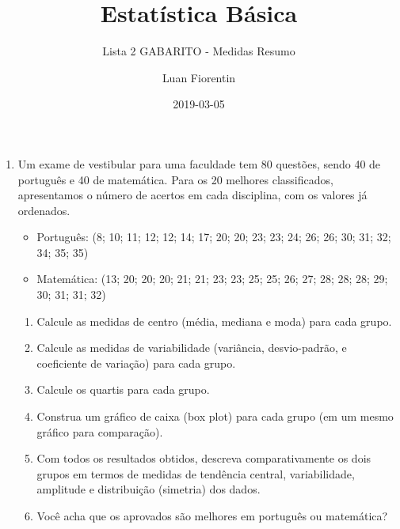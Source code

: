 \documentclass[]{article}
\title{Estatística Básica}
\subtitle{Lista 2 GABARITO - Medidas Resumo}
\author{Luan Fiorentin}
\date{2019-03-05}
\newenvironment{Shaded}{\begin{snugshade}}{\end{snugshade}}
\newcommand{\KeywordTok}[1]{\textcolor[rgb]{0.13,0.29,0.53}{\textbf{#1}}}
\newcommand{\CommentTok}[1]{\textcolor[rgb]{0.56,0.35,0.01}{\textit{#1}}}
\newcommand{\OperatorTok}[1]{\textcolor[rgb]{0.81,0.36,0.00}{\textbf{#1}}}
\newcommand{\NormalTok}[1]{#1}
\providecommand{\tightlist}{%
  \setlength{\itemsep}{0pt}\setlength{\parskip}{0pt}}
\begin{document}
\maketitle

\begin{enumerate}
\def\labelenumi{\arabic{enumi}.}
\tightlist
\item
  Um exame de vestibular para uma faculdade tem 80 questões, sendo 40 de
  português e 40 de matemática. Para os 20 melhores classificados,
  apresentamos o número de acertos em cada disciplina, com os valores já
  ordenados.

  \begin{itemize}
  \tightlist
  \item
    Português: (8; 10; 11; 12; 12; 14; 17; 20; 20; 23; 23; 24; 26; 26;
    30; 31; 32; 34; 35; 35)
  \item
    Matemática: (13; 20; 20; 20; 21; 21; 23; 23; 25; 25; 26; 27; 28; 28;
    28; 29; 30; 31; 31; 32)
  \end{itemize}

  \begin{enumerate}
  \def\labelenumii{(\alph{enumii})}
  \tightlist
  \item
    Calcule as medidas de centro (média, mediana e moda) para cada
    grupo.
  \item
    Calcule as medidas de variabilidade (variância, desvio-padrão, e
    coeficiente de variação) para cada grupo.
  \item
    Calcule os quartis para cada grupo.
  \item
    Construa um gráfico de caixa (box plot) para cada grupo (em um mesmo
    gráfico para comparação).
  \item
    Com todos os resultados obtidos, descreva comparativamente os dois
    grupos em termos de medidas de tendência central, variabilidade,
    amplitude e distribuição (simetria) dos dados.
  \item
    Você acha que os aprovados são melhores em português ou matemática?
  \end{enumerate}
\end{enumerate}

\begin{Shaded}
\end{Shaded}
\end{document}
